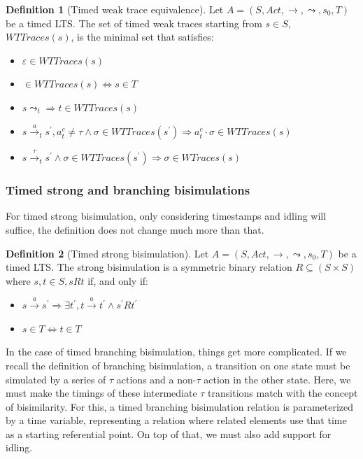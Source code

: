 \documentclass[11pt]{article}
\newcommand{\cmark}{\ding{51}}
\theoremstyle{definition}
\newtheorem{definition}{Definition}
\theoremstyle{plain}
\begin{document}
\begin{definition} [Timed weak trace equivalence]
	Let $ A = (S, Act, \rightarrow, \leadsto, s_0, T) $ be a timed LTS. The set of timed weak traces starting from $ s \in S$, $ WTTraces(s) $, is the minimal set that satisfies:
	\begin{itemize}
		\item $ \varepsilon \in WTTraces(s) $
		\item \cmark $ \in WTTraces(s) \iff s \in T $
		\item $ s\leadsto_t \Rightarrow t \in WTTraces(s) $
		\item $ s\xrightarrow{a}_t s^\prime, a^c_t\not = \tau \wedge \sigma \in WTTraces(s^\prime) \Rightarrow a^c_t\cdot\sigma \in WTTraces(s) $
		\item $ s\xrightarrow{\tau}_t s^\prime \wedge \sigma \in WTTraces(s^\prime) \Rightarrow \sigma \in WTraces(s) $
	\end{itemize}
\end{definition}

\subsubsection{Timed strong and branching bisimulations}

For timed strong bisimulation, only considering timestamps and idling will suffice, the definition does not change much more than that.

\begin{definition} [Timed strong bisimulation]
	Let $ A = (S, Act, \rightarrow, \leadsto, s_0, T) $ be a timed LTS. The strong bisimulation is a symmetric binary relation $ R  \subseteq (S\times S) $ where $ s, t \in S, s R t $ if, and only if:
	\begin{itemize}
		\item $ s\xrightarrow{a}s^\prime \Rightarrow \exists t^\prime, t\xrightarrow{a}t^\prime \wedge s^\prime R t^\prime $
		\item $ s \in T \iff t \in T $
	\end{itemize}
	
\end{definition}

In the case of timed branching bisimulation, things get more complicated. If we recall the definition of branching bisimulation, a transition on one state must be simulated by a series of $ \tau $ actions and a non-$ \tau $ action in the other state. Here, we must make the timings of these intermediate $ \tau $ transitions match with the concept of bisimilarity. For this, a timed branching bisimulation relation is parameterized by a time variable, representing a relation where related elements use that time as a starting referential point. On top of that, we must also add support for idling.
\end{document}
